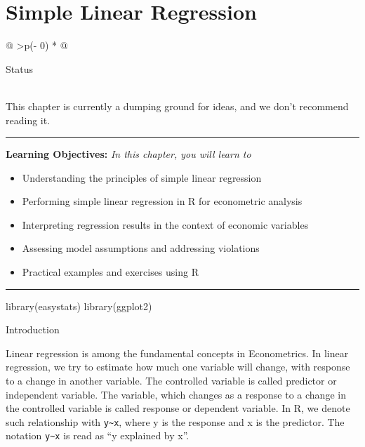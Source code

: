 \documentclass[
  letterpaper,
  paper =a4,
  twoside,
  openright,
  headsepline,
  footsepline,
  listof = totocnumbered,
  chapterprefix = true,
  firstiscover]{scrbook}
\newenvironment{Shaded}{\begin{snugshade}}{\end{snugshade}}
\newcommand{\FunctionTok}[1]{\textcolor[rgb]{0.28,0.35,0.67}{#1}}
\newcommand{\NormalTok}[1]{\textcolor[rgb]{0.00,0.23,0.31}{#1}}
\providecommand{\abstractname}{Learning Objectives} %
\newenvironment{objectives}[1]{%
	\hrule
	\vspace{5pt}
	\small\textbf{\abstractname: } 
	\newline
	\vspace{0.1cm}
	\small\emph{#1} %
	\itshape %
}{%
	\vspace{5pt}
	\hrule
	\vspace{0.6cm}
}
\begin{document}

\hypertarget{simple-linear-regression}{%
\chapter{Simple Linear Regression}\label{simple-linear-regression}}

\begin{longtable}[]{@{}
  >{\centering\arraybackslash}p{(\columnwidth - 0\tabcolsep) * }@{}}
\toprule\noalign{}
\begin{minipage}[b]{\linewidth}\centering
Status
\end{minipage} \\
\midrule\noalign{}
\endhead
\bottomrule\noalign{}
\endlastfoot
This chapter is currently a dumping ground for ideas, and we don't
recommend reading it. \\
\end{longtable}

\begin{objectives}{In this chapter, you will learn to}
\begin{itemize}

\item{Understanding the principles of simple linear regression}

\item{Performing simple linear regression in R for econometric analysis}

\item{Interpreting regression results in the context of economic variables}

\item{Assessing model assumptions and addressing violations}

\item{Practical examples and exercises using R}

\end{itemize}

\end{objectives}

\begin{Shaded}
\begin{Highlighting}[numbers=left,,]
\FunctionTok{library}\NormalTok{(easystats)}
\FunctionTok{library}\NormalTok{(ggplot2)}
\end{Highlighting}
\end{Shaded}

Introduction

Linear regression is among the fundamental concepts in Econometrics. In
linear regression, we try to estimate how much one variable will change,
with response to a change in another variable. The controlled variable
is called predictor or independent variable. The variable, which changes
as a response to a change in the controlled variable is called response
or dependent variable. In R, we denote such relationship with
\texttt{y\textasciitilde{}x}, where y is the response and x is the
predictor. The notation \texttt{y\textasciitilde{}x} is read as ``y
explained by x''.
\end{document}
